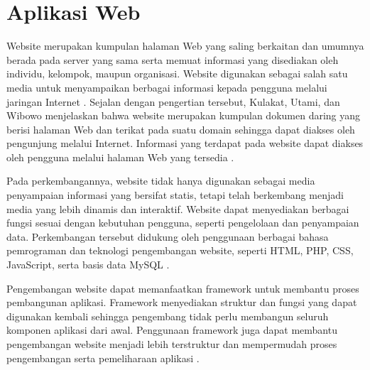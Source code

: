 


\section{Aplikasi Web}

Website merupakan kumpulan halaman Web yang saling berkaitan dan umumnya berada pada server yang sama serta memuat informasi yang disediakan oleh individu, kelompok, maupun organisasi. Website digunakan sebagai salah satu media untuk menyampaikan berbagai informasi kepada pengguna melalui jaringan Internet \parencite{Laksono2021}. Sejalan dengan pengertian tersebut, Kulakat, Utami, dan Wibowo menjelaskan bahwa website merupakan kumpulan dokumen daring yang berisi halaman Web dan terikat pada suatu domain sehingga dapat diakses oleh pengunjung melalui Internet. Informasi yang terdapat pada website dapat diakses oleh pengguna melalui halaman Web yang tersedia \parencite{Kulakat2021}.

Pada perkembangannya, website tidak hanya digunakan sebagai media penyampaian informasi yang bersifat statis, tetapi telah berkembang menjadi media yang lebih dinamis dan interaktif. Website dapat menyediakan berbagai fungsi sesuai dengan kebutuhan pengguna, seperti pengelolaan dan penyampaian data. Perkembangan tersebut didukung oleh penggunaan berbagai bahasa pemrograman dan teknologi pengembangan website, seperti HTML, PHP, CSS, JavaScript, serta basis data MySQL \parencite{Purbo2021}.

Pengembangan website dapat memanfaatkan framework untuk membantu proses pembangunan aplikasi. Framework menyediakan struktur dan fungsi yang dapat digunakan kembali sehingga pengembang tidak perlu membangun seluruh komponen aplikasi dari awal. Penggunaan framework juga dapat membantu pengembangan website menjadi lebih terstruktur dan mempermudah proses pengembangan serta pemeliharaan aplikasi \parencite{Purbo2021}.

